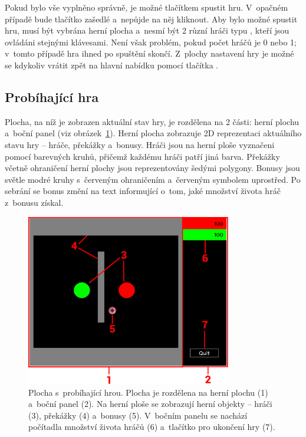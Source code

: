 Pokud bylo vše vyplněno správně, je možné tlačítkem  spustit hru. V~opačném případě bude tlačítko zašedlé a~nepůjde na něj kliknout. Aby bylo možné spustit hru, musí být vybrána herní plocha a~nesmí být 2 různí hráči typu , kteří jsou ovládáni stejnými klávesami. Není však problém, pokud počet hráčů je 0 nebo 1; v~tomto případě hra ihned po spuštění skončí. Z~plochy nastavení hry je možné se kdykoliv vrátit zpět na hlavní nabídku pomocí tlačítka .

\subsection*{Probíhající hra}

Plocha, na níž je zobrazen aktuální stav hry, je rozdělena na 2 části: herní plochu a~boční panel (viz obrázek~\ref{fig:in-game}). Herní plocha zobrazuje 2D reprezentaci aktuálního stavu hry -- hráče, překážky a~bonusy. Hráči jsou na herní ploše vyznačeni pomocí barevných kruhů, přičemž každému hráči patří jiná barva. Překážky včetně ohraničení herní plochy jsou reprezentovány šedými polygony. Bonusy jsou světle modré kruhy s~červeným ohraničením a~červeným symbolem  uprostřed. Po sebrání se bonus změní na text informující o~tom, jaké množství života hráč z~bonusu získal.

\begin{figure}[ht]
    \centering
    \includegraphics[width=0.8\textwidth]{doc/obrazky-figures/in-game.pdf}
    \caption{Plocha s~probíhající hrou. Plocha je rozdělena na herní plochu (1) a~boční panel (2). Na herní ploše se zobrazují herní objekty -- hráči (3), překážky (4) a~bonusy (5). V~bočním panelu se nachází počítadla množství života hráčů (6) a~tlačítko pro ukončení hry (7).}
    \label{fig:in-game}
\end{figure}

